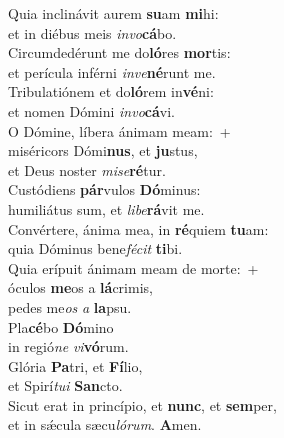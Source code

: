 \evenverse Quia inclinávit aurem \textbf{su}am \textbf{mi}hi:~\*\\
\evenverse et in diébus meis \textit{in}\textit{vo}\textbf{cá}bo.\\
\oddverse Circumdedérunt me do\textbf{ló}res \textbf{mor}tis:~\*\\
\oddverse et perícula inférni \textit{in}\textit{ve}\textbf{né}runt me.\\
\evenverse Tribulatiónem et do\textbf{ló}rem in\textbf{vé}ni:~\*\\
\evenverse et nomen Dómini \textit{in}\textit{vo}\textbf{cá}vi.\\
\oddverse O Dómine, líbera ánimam meam:~+\\
\oddverse  miséricors Dómi\textbf{nus}, et \textbf{ju}stus,~\*\\
\oddverse et Deus noster \textit{mi}\textit{se}\textbf{ré}tur.\\
\evenverse Custódiens \textbf{pár}vulos \textbf{Dó}minus:~\*\\
\evenverse humiliátus sum, et \textit{li}\textit{be}\textbf{rá}vit me.\\
\oddverse Convértere, ánima mea, in \textbf{ré}quiem \textbf{tu}am:~\*\\
\oddverse quia Dóminus bene\textit{fé}\textit{cit} \textbf{ti}bi.\\
\evenverse Quia erípuit ánimam meam de morte:~+\\
\evenverse  óculos \textbf{me}os a \textbf{lá}crimis,~\*\\
\evenverse pedes me\textit{os} \textit{a} \textbf{la}psu.\\
\oddverse Pla\textbf{cé}bo \textbf{Dó}mino~\*\\
\oddverse in regió\textit{ne} \textit{vi}\textbf{vó}rum.\\
\evenverse Glória \textbf{Pa}tri, et \textbf{Fí}lio,~\*\\
\evenverse et Spirí\textit{tu}\textit{i} \textbf{San}cto.\\
\oddverse Sicut erat in princípio, et \textbf{nunc}, et \textbf{sem}per,~\*\\
\oddverse et in sǽcula sæcu\textit{ló}\textit{rum}. \textbf{A}men.\\
